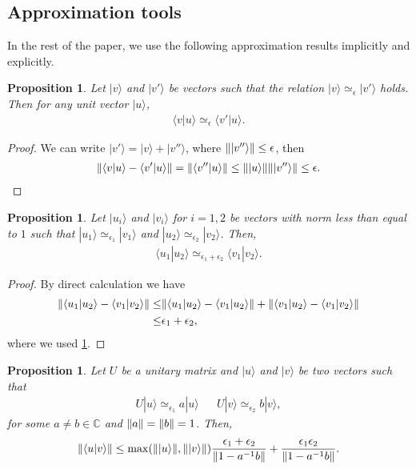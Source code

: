 \documentclass[11pt,letterpaper]{article}
\newcommand{\ket}[1]{|#1\rangle}
\newcommand{\braket}[2]{\langle#1|#2\rangle}
\DeclarePairedDelimiter{\norm}{\lVert}{\rVert}
\newcommand{\C}{\mathbb{C}}
\newcommand{\1}{\mathbb{1}}
\newcommand{\ep}{\epsilon}
\newcommand{\appd}[1]{\simeq_{#1}}
\newtheorem{proposition}[theorem]{Proposition}
\theoremstyle{definition}
\begin{document}
\subsection{Approximation tools}
In the rest of the paper, we use the following approximation results implicitly and explicitly.
\begin{proposition}
	\label{prop:inner_pd}
	Let $\ket{v}$ and $\ket{v'}$ be vectors such that the relation $\ket{v} \appd{\epsilon} \ket{v'}$ holds.
	Then for any unit vector $\ket{u}$,
	\begin{align*}
		 \braket{v}{u} \appd{\ep} \braket{v'}{u}.
	\end{align*}	
\end{proposition}
\begin{proof}
	We can write $\ket{v'} = \ket{v} + \ket{v''}$, where $\norm{\ket{v''}} \leq \epsilon$,
	then
	\begin{align*}
	\norm{ \braket{v}{u} - \braket{v'}{u} } = \norm{\braket{v''}{u}} \leq \norm{\ket{u}}\norm{\ket{v''}} \leq \epsilon.
	\end{align*}
\end{proof}
\begin{proposition}
	Let $\ket{u_i}$ and $\ket{v_i}$ for $i = 1,2$ be vectors with norm less than equal to $1$
	such that 
	$\ket{u_1} \appd{\ep_1} \ket{v_1}$ and $\ket{u_2} \appd{\ep_2} \ket{v_2}$.
	Then, 
	\begin{align*}
		\braket{u_1}{u_2} \appd{\ep_1+ \ep_2} \braket{v_1}{v_2}.
	\end{align*}
\end{proposition}
\begin{proof}
	By direct calculation we have
	\begin{align*}
		\norm{ \braket{u_1}{u_2} - \braket{v_1}{v_2}} \leq &\norm{\braket{u_1}{u_2} - \braket{v_1}{u_2}}
		+ \norm{\braket{v_1}{u_2} - \braket{v_1}{v_2}} \\
		\leq & \ep_1 + \ep_2,
	\end{align*}
	where we used \cref{prop:inner_pd}.
\end{proof}
\begin{proposition}
\label{prop:orthog}
	Let $U$ be a unitary matrix and $\ket{u}$ and $\ket{v}$ be two vectors
	such that
	\begin{align*}
		U\ket{u} \appd{\ep_1} a \ket{u} &&
		U\ket{v} \appd{\ep_2} b \ket{v}, 
	\end{align*}
	for some $a \neq b \in \C$ and $\norm{a} = \norm{b} = 1$. Then,
	\begin{align*}
		\norm{\braket{u}{v}} \leq \max(\norm{\ket{u}}, \norm{\ket{v}})\frac{\ep_1+\ep_2}{\norm{1-a^{-1}b}} + \frac{\ep_1\ep_2}{\norm{1-a^{-1}b}}.
	\end{align*}
\end{proposition}
\end{document}
